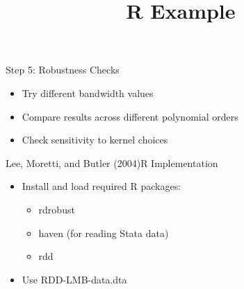 \documentclass[hyperref={pdfpagelabels=false}]{beamer}
\begin{document}
\begin{frame}{Step 5: Robustness Checks}
	\begin{itemize}

			\item Try different bandwidth values
					\vspace{0.2cm}
			\item Compare results across different polynomial orders
					\vspace{0.2cm}
			\item Check sensitivity to kernel choices
		\end{itemize}

\end{frame}




\title[]  
{R Example}


\author 
{}

\institute{}






\date
{}


\begin{frame}{}
	\titlepage
\end{frame}



\begin{frame}{Lee, Moretti, and Butler (2004)}{R Implementation}
	\begin{itemize}
		\item Install and load required R packages:
		\begin{itemize}
			\item rdrobust
			\item haven (for reading Stata data)
			\item rdd
		\end{itemize}
		\vspace{0.2cm}
		\item Use RDD-LMB-data.dta
	\end{itemize}
\end{frame}
\end{document}
